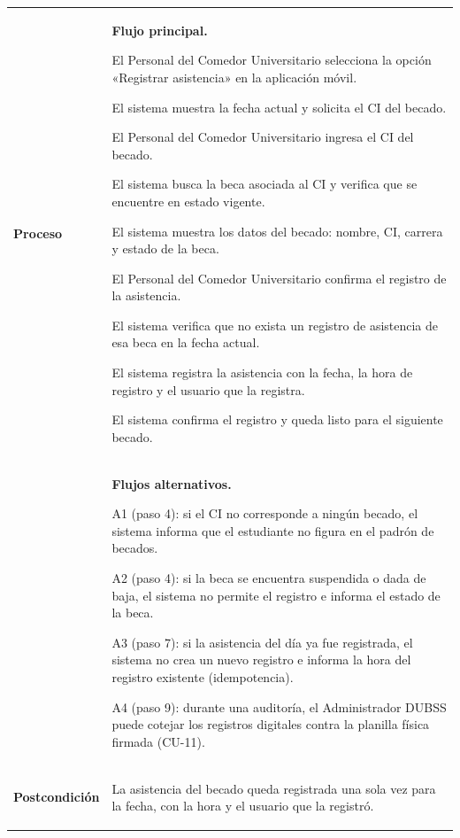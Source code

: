 \begin{longtable}{>{\raggedright\arraybackslash}p{2.9cm} >{\raggedright\arraybackslash}p{12.6cm}}
\midrule
\textbf{Proceso} & \textbf{Flujo principal.}
\begin{cupasos}
    \item El Personal del Comedor Universitario selecciona la opción «Registrar asistencia» en la aplicación móvil.
    \item El sistema muestra la fecha actual y solicita el CI del becado.
    \item El Personal del Comedor Universitario ingresa el CI del becado.
    \item El sistema busca la beca asociada al CI y verifica que se encuentre en estado vigente.
    \item El sistema muestra los datos del becado: nombre, CI, carrera y estado de la beca.
    \item El Personal del Comedor Universitario confirma el registro de la asistencia.
    \item El sistema verifica que no exista un registro de asistencia de esa beca en la fecha actual.
    \item El sistema registra la asistencia con la fecha, la hora de registro y el usuario que la registra.
    \item El sistema confirma el registro y queda listo para el siguiente becado.
\end{cupasos} \\
 & \textbf{Flujos alternativos.}
\begin{cuvin}
    \item A1 (paso 4): si el CI no corresponde a ningún becado, el sistema informa que el estudiante no figura en el padrón de becados.
    \item A2 (paso 4): si la beca se encuentra suspendida o dada de baja, el sistema no permite el registro e informa el estado de la beca.
    \item A3 (paso 7): si la asistencia del día ya fue registrada, el sistema no crea un nuevo registro e informa la hora del registro existente (idempotencia).
    \item A4 (paso 9): durante una auditoría, el Administrador DUBSS puede cotejar los registros digitales contra la planilla física firmada (CU-11).
\end{cuvin} \\
\midrule
\textbf{Postcondición} & \vspace{-\baselineskip}\begin{cuvin}
    \item La asistencia del becado queda registrada una sola vez para la fecha, con la hora y el usuario que la registró.

\end{cuvin}
\end{longtable}

